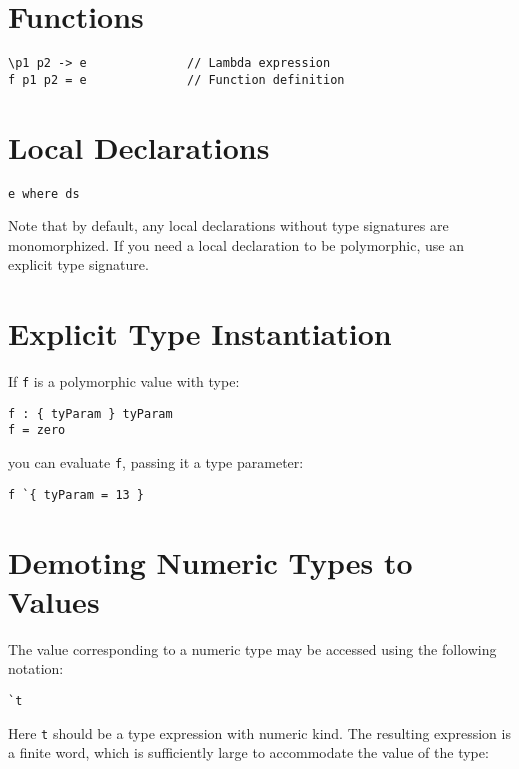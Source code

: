 \section{Functions}\label{functions}

\begin{verbatim}
\p1 p2 -> e              // Lambda expression
f p1 p2 = e              // Function definition
\end{verbatim}

\section{Local Declarations}\label{local-declarations}

\begin{verbatim}
e where ds
\end{verbatim}

Note that by default, any local declarations without type signatures are
monomorphized. If you need a local declaration to be polymorphic, use an
explicit type signature.

\section{Explicit Type Instantiation}\label{explicit-type-instantiation}

If \texttt{f} is a polymorphic value with type:

\begin{verbatim}
f : { tyParam } tyParam
f = zero
\end{verbatim}

you can evaluate \texttt{f}, passing it a type parameter:

\begin{verbatim}
f `{ tyParam = 13 }
\end{verbatim}

\section{Demoting Numeric Types to
Values}\label{demoting-numeric-types-to-values}

The value corresponding to a numeric type may be accessed using the
following notation:

\begin{verbatim}
`t
\end{verbatim}

Here \texttt{t} should be a type expression with numeric kind. The
resulting expression is a finite word, which is sufficiently large to
accommodate the value of the type:

